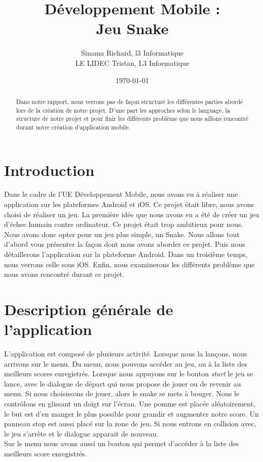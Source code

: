 \documentclass{article}
\title{Développement Mobile : \\ Jeu Snake}
\author{Sinama Richard, l3 Informatique \\ LE LIDEC Tristan, L3 Informatique}
\date{\today}
\begin{document}
\maketitle %

\begin{abstract}
Dans notre rapport, nous verrons pas de façon structuré les différentes parties abordé lors de la création de notre projet. D'une part les approches selon le language, la structure de notre projet et pour finir les différents problème que nous aillons rencontré durant notre création d'application mobile.
\end{abstract}

\tableofcontents

\newpage

\section{Introduction}
\label{section:intro} %
Dans le cadre de l'UE Développement Mobile, nous avons eu à réaliser une application sur les plateformes Android et iOS. Ce projet était libre, nous avons choisi de réaliser un jeu. La première idée que nous avons eu a été de créer un jeu d'échec humain contre ordinateur. Ce projet était trop ambitieux pour nous. Nous avons donc opter pour un jeu plus simple, un Snake. Nous allons tout d'abord vous présenter la façon dont nous avons aborder ce projet. Puis nous détaillerons l'application sur la plateforme Android. Dans un troisième temps, nous verrons celle sous iOS. Enfin, nous examinerons les différents problème que nous avons rencontré durant ce projet.


\section{Description générale de l'application}
L'application est composé de plusieurs activité. Lorsque nous la lançons, nous arrivons sur le menu. Du menu, nous pouvons accéder au jeu, ou à la liste des meilleurs scores enregistrés. Lorsque nous appuyons sur le bouton \textit{start} le jeu se lance, avec le dialogue de départ qui nous propose de jouer ou de revenir au menu. Si nous choisissons de jouer, alors le snake se mets à bouger. Nous le contrôlons en glissant un doigt sur l'écran. Une pomme est placée aléatoirement, le but est d'en manger le plus possible pour grandir et augmenter notre score. Un panneau stop est aussi placé sur la zone de jeu. Si nous entrons en collision avec, le jeu s'arrête et le dialogue apparait de nouveau.\\
Sur le menu nous avons aussi un bouton qui permet d'accéder à la liste des meilleurs score enregistrés.
\end{document}
